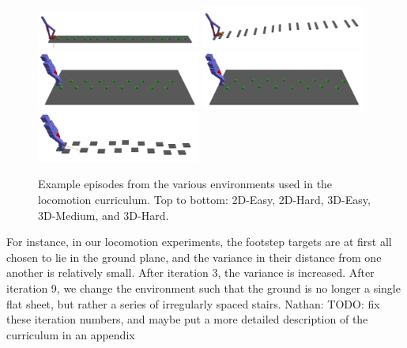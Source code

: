 \documentclass[conference]{IEEEtran}
\newcommand{\nhatch}[1]{{\leavevmode\color{magenta} Nathan: #1}}
\begin{document}
\begin{figure}
  \includegraphics[width=0.48\textwidth]{../figures/2D_EASY.png}
  \includegraphics[width=0.48\textwidth]{../figures/2D_HARD.png}
  \includegraphics[width=0.48\textwidth]{../figures/3D_EASY.png}
  \includegraphics[width=0.48\textwidth]{../figures/3D_MEDIUM.png}
  \includegraphics[width=0.48\textwidth]{../figures/3D_HARD.png}
  \caption{\label{fig:curriculum} Example episodes from the various environments used in the locomotion curriculum.
  Top to bottom: 2D-Easy, 2D-Hard, 3D-Easy, 3D-Medium, and 3D-Hard.}
\end{figure}

For instance, in our locomotion experiments, the footstep targets are at first all chosen to lie in the ground plane, and the variance in their distance from one another is relatively small.
After iteration 3, the variance is increased.
After iteration 9, we change the environment such that the ground is no longer a single flat sheet, but rather a series of irregularly spaced stairs.
\nhatch{TODO: fix these iteration numbers, and maybe put a more detailed description of the curriculum in an appendix}

\end{document}
